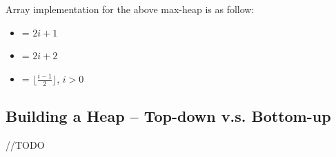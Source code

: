 Array implementation for the above max-heap is as follow:

\begin{itemize}
  \item {} = $2i + 1$
  \item {} = $2i + 2$
  \item {} = $\lfloor \frac{i - 1}{2} \rfloor$, $i > 0$
\end{itemize}

\subsection{Building a Heap -- Top-down v.s. Bottom-up}

//TODO
